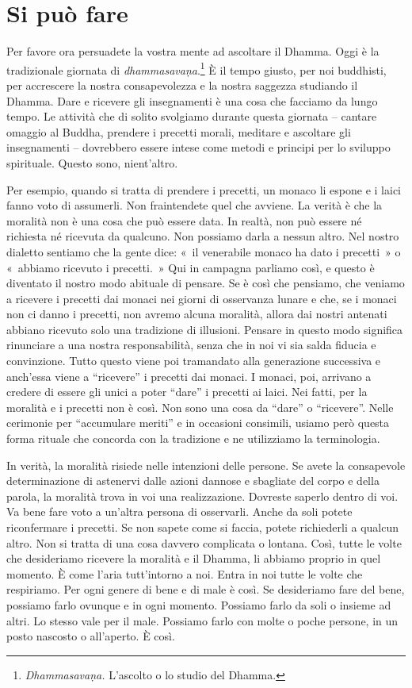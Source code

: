 \chapter{Si può fare}

Per favore ora persuadete la vostra mente ad ascoltare il Dhamma. Oggi è
la tradizionale giornata di \emph{dhammasavaṇa}.\footnote{\emph{Dhammasavaṇa.}
  L'ascolto o lo studio del Dhamma.} È il tempo giusto, per noi
buddhisti, per accrescere la nostra consapevolezza e la nostra saggezza
studiando il Dhamma. Dare e ricevere gli insegnamenti è una cosa che
facciamo da lungo tempo. Le attività che di solito svolgiamo durante
questa giornata -- cantare omaggio al Buddha, prendere i precetti
morali, meditare e ascoltare gli insegnamenti -- dovrebbero essere
intese come metodi e principi per lo sviluppo spirituale. Questo sono,
nient'altro.

Per esempio, quando si tratta di prendere i precetti, un monaco li
espone e i laici fanno voto di assumerli. Non fraintendete quel che
avviene. La verità è che la moralità non è una cosa che può essere data.
In realtà, non può essere né richiesta né ricevuta da qualcuno. Non
possiamo darla a nessun altro. Nel nostro dialetto sentiamo che la gente
dice: «~il venerabile monaco ha dato i precetti~» o «~abbiamo ricevuto i
precetti.~» Qui in campagna parliamo così, e questo è diventato il
nostro modo abituale di pensare. Se è così che pensiamo, che veniamo a
ricevere i precetti dai monaci nei giorni di osservanza lunare e che, se
i monaci non ci danno i precetti, non avremo alcuna moralità, allora dai
nostri antenati abbiano ricevuto solo una tradizione di illusioni.
Pensare in questo modo significa rinunciare a una nostra responsabilità,
senza che in noi vi sia salda fiducia e convinzione. Tutto questo viene
poi tramandato alla generazione successiva e anch'essa viene a
``ricevere'' i precetti dai monaci. I monaci, poi, arrivano a credere di
essere gli unici a poter ``dare'' i precetti ai laici. Nei fatti, per la
moralità e i precetti non è così. Non sono una cosa da ``dare'' o
``ricevere''. Nelle cerimonie per ``accumulare meriti'' e in occasioni
consimili, usiamo però questa forma rituale che concorda con la
tradizione e ne utilizziamo la terminologia.

In verità, la moralità risiede nelle intenzioni delle persone. Se avete
la consapevole determinazione di astenervi dalle azioni dannose e
sbagliate del corpo e della parola, la moralità trova in voi una
realizzazione. Dovreste saperlo dentro di voi. Va bene fare voto a
un'altra persona di osservarli. Anche da soli potete riconfermare i
precetti. Se non sapete come si faccia, potete richiederli a qualcun
altro. Non si tratta di una cosa davvero complicata o lontana. Così,
tutte le volte che desideriamo ricevere la moralità e il Dhamma, li
abbiamo proprio in quel momento. È come l'aria tutt'intorno a noi. Entra
in noi tutte le volte che respiriamo. Per ogni genere di bene e di male
è così. Se desideriamo fare del bene, possiamo farlo ovunque e in ogni
momento. Possiamo farlo da soli o insieme ad altri. Lo stesso vale per
il male. Possiamo farlo con molte o poche persone, in un posto nascosto
o all'aperto. È così.

